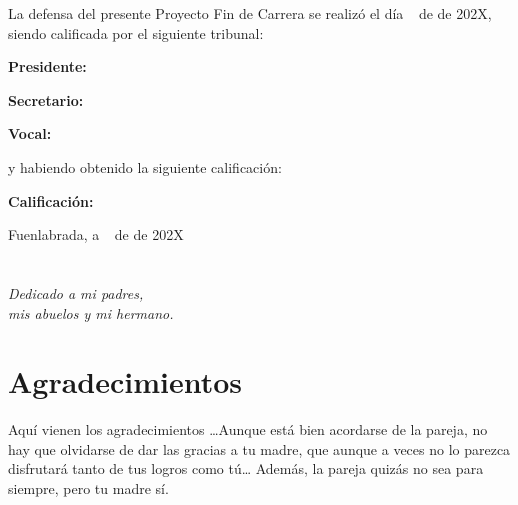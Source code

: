 \documentclass[a4paper, 12pt, oneside]{book}
\begin{document}
\vspace{1cm}
La defensa del presente Proyecto Fin de Carrera se realizó el día \qquad$\;\,$ de \qquad\qquad\qquad\qquad \newline de 202X, siendo calificada por el siguiente tribunal:


\vspace{0.5cm}
\textbf{Presidente:}

\vspace{1.2cm}
\textbf{Secretario:}

\vspace{1.2cm}
\textbf{Vocal:}


\vspace{1.2cm}
y habiendo obtenido la siguiente calificación:

\vspace{1cm}
\textbf{Calificación:}


\vspace{1cm}
\begin{flushright}
Fuenlabrada, a \qquad$\;\,$ de \qquad\qquad\qquad\qquad de 202X
\end{flushright}


\chapter*{}
\begin{flushright}
\textit{Dedicado a 
mi padres, \\
mis abuelos 
y mi hermano.}
\end{flushright}


\chapter*{Agradecimientos}

Aquí vienen los agradecimientos \ldots Aunque está bien acordarse de la pareja, no hay que olvidarse de dar las gracias a tu madre, que aunque a veces no lo parezca disfrutará tanto de tus logros como tú\ldots 
Además, la pareja quizás no sea para siempre, pero tu madre sí.
\end{document}
